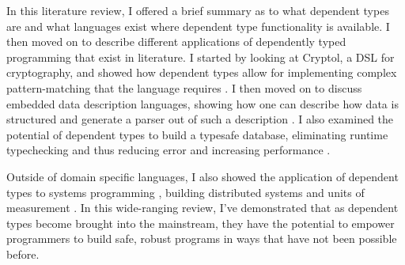 In this literature review, I offered a brief summary as to what dependent types
are and what languages exist where dependent type functionality is available. I
then moved on to describe different applications of dependently typed
programming that exist in literature. I started by looking at Cryptol, a DSL for
cryptography, and showed how dependent types allow for implementing complex
pattern-matching that the language requires \cite{power_of_pi}. I then moved on
to discuss embedded data description languages, showing how one can describe how
data is structured and generate a parser out of such a description
\cite{power_of_pi}. I also examined the potential of dependent types to build a
typesafe database, eliminating runtime typechecking and thus reducing error and
increasing performance \cite{power_of_pi, eisenberg2016}. 

Outside of domain specific languages, I also showed the application of dependent
types to systems programming \cite{idris_systems_programming}, building
distributed systems \cite{fstar_distributed_programming} and units of
measurement \cite{gundry2013}. In this wide-ranging review, I've demonstrated
that as dependent types become brought into the mainstream, they have the
potential to empower programmers to build safe, robust programs in ways that
have not been possible before. 